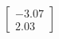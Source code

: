 \documentclass[preview]{standalone}
\begin{document}
\begin{align*}
\begin{bmatrix} -3.07 \\ 2.03 \end{bmatrix}
\end{align*}
\end{document}
